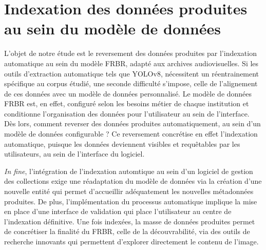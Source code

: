 \chapter{\label{II_3}Indexation des données produites au sein du modèle de données} 

L’objet de notre étude est le reversement des données produites par l’indexation automatique au sein du modèle FRBR, adapté aux archives audiovisuelles. Si les outils d’extraction automatique tels que YOLOv8, nécessitent un réentrainement spécifique au corpus étudié, une seconde difficulté s'impose, celle de l'alignement de ces données avec un modèle de données personnalisé. Le modèle de données FRBR est, en effet, configuré selon les besoins métier de chaque institution et conditionne l’organisation des données pour l’utilisateur au sein de l’interface. Dès lors, comment reverser des données produites automatiquement, au sein d’un modèle de données configurable ? Ce reversement concrétise en effet l’indexation automatique, puisque les données deviennent visibles et requêtables par les utilisateurs, au sein de l'interface du logiciel. 







\textit{In fine}, l'intégration de l'indexation automtique au sein d'un logiciel de gestion des collections exige une réadaptation du modèle de données via la création d'une nouvelle entité qui permet d'accueillir adéquatement les nouvelles métadonnées produites. De plus, l'implémentation du processus automatique implique la mise en place d'une interface de validation qui place l'utilisateur au centre de l'indexation définitive. Une fois indexées, la masse de données produites permet de concrétiser la finalité du \gls{FRBR}, celle de la découvrabilité, via des outils de recherche innovants qui permettent d'explorer directement le contenu de l'image. 

\clearpage